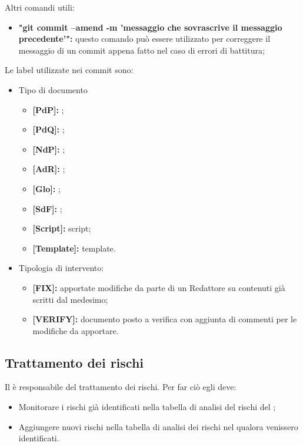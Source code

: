 Altri comandi utili:

\begin{itemize}
	\item \textbf{"git commit --amend -m 'messaggio che sovrascrive il messaggio precedente'":} questo comando può essere utilizzato per correggere il messaggio di un commit appena fatto nel caso di errori di battitura;
\end{itemize}

Le label utilizzate nei commit sono:
\begin{itemize}
	\item Tipo di documento
	\begin{itemize}
		\item \textbf{[PdP]:} \docNamePdP;
		\item \textbf{[PdQ]:} \docNamePdQ;
		\item \textbf{[NdP]:} \docNameNdP;
		\item \textbf{[AdR]:} \docNameAdR;
		\item \textbf{[Glo]:} \docNameGlo;
		\item \textbf{[SdF]:} \docNameSdF;
		\item \textbf{[Script]:} script;
		\item \textbf{[Template]:} template.
	\end{itemize}
	
	\item Tipologia di intervento:
	\begin{itemize}
		\item \textbf{[FIX]:} apportate modifiche da parte di un Redattore su contenuti già scritti dal medesimo;
		\item \textbf{[VERIFY]:} documento posto a verifica con aggiunta di commenti per le modifiche da apportare.
	\end{itemize}
\end{itemize}

\subsection{Trattamento dei rischi}
Il \roleProjectManager{} è responsabile del trattamento dei rischi.
Per far ciò egli deve:
\begin{itemize}
	\item Monitorare i rischi già identificati nella tabella di analisi del rischi del \docNameVersionPdP;
	\item Aggiungere nuovi rischi nella tabella di analisi dei rischi nel \docNameVersionPdP{} qualora venissero identificati.
\end{itemize}

